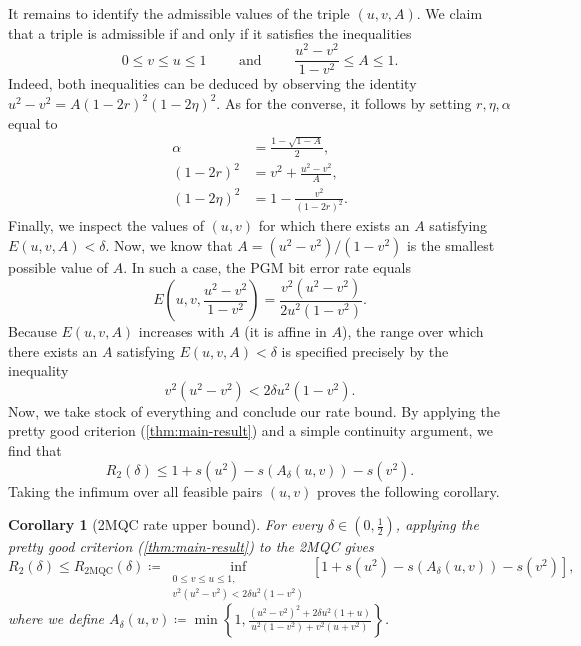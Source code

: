 \documentclass[11pt]{article}
\renewcommand{\leq}{\leqslant}
\newtheorem{corollary}[corollary]{Corollary}
\theoremstyle{remark}
\newcommand{\mMQC}{2\mathrm{MQC}}
\begin{document}
It remains to identify the admissible values of the triple $(u,v,A)$. We claim that a triple is admissible if and only if it satisfies the inequalities
\begin{equation*}
0\leq v \leq u \leq 1
\qquad
\text{ and }
\qquad
\frac{u^2-v^2}{1-v^2}\leq A\leq 1.
\end{equation*}
Indeed, both inequalities can be deduced by observing the identity $u^2-v^2=A(1-2r)^2(1-2\eta)^2$. As for the converse, it follows by setting $r,\eta,\alpha$ equal to
\begin{align*}
\alpha &= \frac{1-\sqrt{1-A}}{2}, \\
(1-2r)^2 &= v^2+\frac{u^2-v^2}{A}, \\
(1-2\eta)^2 &= 1-\frac{v^2}{(1-2r)^2}.
\end{align*}
Finally, we inspect the values of $(u,v)$ for which there exists an $A$ satisfying $E(u,v,A)<\delta$. Now, we know that $A=(u^2-v^2)/(1-v^2)$ is the smallest possible value of $A$. In such a case, the PGM bit error rate equals
\begin{equation*}
E\left(u,v,\frac{u^2-v^2}{1-v^2}\right)
=\frac{v^2(u^2-v^2)}{2u^2(1-v^2)}.
\end{equation*}
Because $E(u,v,A)$ increases with $A$ (it is affine in $A$), the range over which there exists an $A$ satisfying $E(u,v,A)<\delta$ is specified precisely by the inequality
\begin{equation*}
v^2(u^2-v^2)<2\delta u^2(1-v^2).
\end{equation*}
Now, we take stock of everything and conclude our rate bound. By applying the pretty good criterion (\cref{thm:main-result}) and a simple continuity argument, we find that
\begin{equation*}
R_2(\delta) \leq 1+s(u^2)-s\left(A_\delta(u,v)\right)-s(v^2).
\end{equation*}
Taking the infimum over all feasible pairs $(u,v)$ proves the following corollary.

\begin{corollary}[2MQC rate upper bound]
\label{cor:2mqc-rate}
For every $\delta \in (0,\frac{1}{2})$, applying the pretty good criterion (\cref{thm:main-result}) to the 2MQC gives
\begin{equation}
\label{eq:2mqc-rate}
R_2(\delta) \leq R_{\mMQC}(\delta)
\coloneqq
\inf_{\substack{0\leq v \leq u \leq 1, \\
v^2(u^2-v^2)<2\delta u^2(1-v^2)}}
\left[
1+s(u^2)-s\left(A_\delta(u,v)\right)-s(v^2)
\right],
\end{equation}
where we define $A_\delta(u,v) \coloneqq \min\left\{1,\frac{(u^2-v^2)^2+2\delta u^2(1+u)}
{u^2(1-v^2)+v^2(u+v^2)}\right\}$.
\end{corollary}
\end{document}
